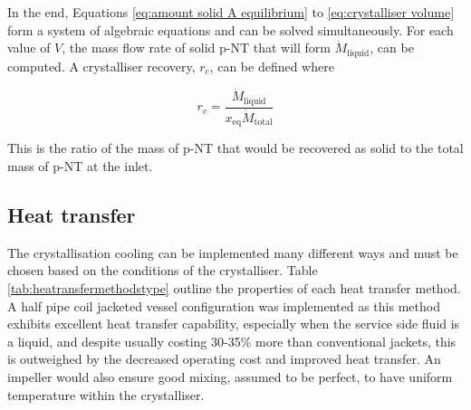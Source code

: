 In the end, Equations \ref{eq:amount solid A equilibrium} to \ref{eq:crystalliser volume} form a system of algebraic equations and can be solved simultaneously. For each value of $V$, the mass flow rate of solid p-NT that will form $\dot{M}_{\mathrm{liquid}}$, can be computed. A crystalliser recovery, $r_c$, can be defined where

\begin{equation}
    r_c = \frac{\dot{M}_{\mathrm{liquid}}}{x_{\mathrm{eq}} \dot{M}_{\mathrm{total}}}
\end{equation}

\noindent This is the ratio of the mass of p-NT that would be recovered as solid to the total mass of p-NT at the inlet.

\subsection{Heat transfer}\label{sec:heat transfer crystalliser}

The crystallisation cooling can be implemented many different ways and must be chosen based on the conditions of the crystalliser. Table \ref{tab:heatransfermethodstype} outline the properties of each heat transfer method. A half pipe coil jacketed vessel configuration was implemented as this method exhibits excellent heat transfer capability, especially when the service side fluid is a liquid, and despite usually costing 30-35\% more than conventional jackets, this is outweighed by the decreased operating cost and improved heat transfer. An impeller would also ensure good mixing, assumed to be perfect, to have uniform temperature within the crystalliser. 

